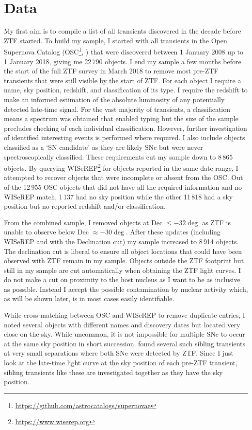 \documentclass[a4paper,oneside,12pt, class=Latex/Classes/PhDthesisPSnPDF, crop=false]{standalone}
\begin{document}
\section{Data}
\label{Pre-ZTF_data}
My first aim is to compile a list of all transients discovered in the decade before ZTF started. To build my sample, I started with all transients in the Open Supernova Catalog (OSC\footnote{\url{https://github.com/astrocatalogs/supernovae}}, \citealt{Open_SN_cat}) that were discovered between 1 January 2008 up to 1 January 2018, giving me 22\,790 objects. I end my sample a few months before the start of the full ZTF survey in March 2018 to remove most pre-ZTF transients that were still visible by the start of ZTF. For each object I require a name, sky position, redshift, and classification of its type. I require the redshift to make an informed estimation of the absolute luminosity of any potentially detected late-time signal. For the vast majority of transients, a classification means a spectrum was obtained that enabled typing but the size of the sample precludes checking of each individual classification. However, further investigation of identified interesting events is performed where required. I also include objects classified as a `SN candidate' as they are likely SNe but were never spectroscopically classified. These requirements cut my sample down to 8\,865 objects. By querying WISeREP\footnote{\url{https://www.wiserep.org}} \citep{wiserep} for objects reported in the same date range, I attempted to recover objects that were incomplete or absent from the OSC. Out of the 12\,955 OSC objects that did not have all the required information and no WISeREP match, 1\,137 had no sky position while the other 11\,818 had a sky position but no reported redshift and/or classification.

From the combined sample, I removed objects at Dec $\leq -32\deg$ as ZTF is unable to observe below Dec $\approx -30\deg$. After these updates (including WISeREP and with the Declination cut) my sample increased to 8\,914 objects. The declination cut is liberal to ensure all object locations that could have been observed with ZTF remain in my sample. Objects outside the ZTF footprint but still in my sample are cut automatically when obtaining the ZTF light curves. I do not make a cut on proximity to the host nucleus as I want to be as inclusive as possible. Instead I accept the possible contamination by nuclear activity which, as will be shown later, is in most cases easily identifiable.

While cross-matching between OSC and WISeREP to remove duplicate entries, I noted several objects with different names and discovery dates but located very close on the sky. While uncommon, it is not impossible for multiple SNe to occur at the same sky position in short succession. \citet{Terwel_2024_paper1} found several such sibling transients at very small separations where both SNe were detected by ZTF. Since I just look at the late-time light curve at the sky position of each pre-ZTF transient, sibling transients like these are investigated together as they have the sky position.
\end{document}
